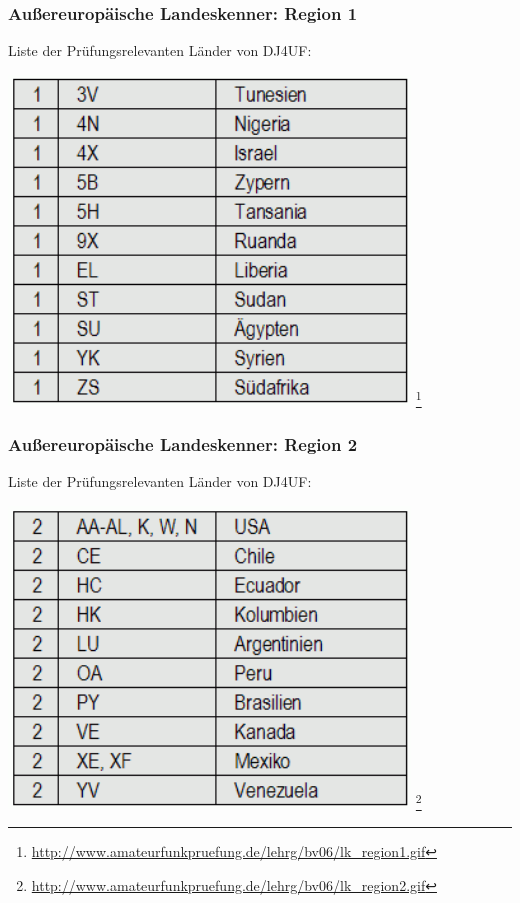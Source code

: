 \begin{frame}
    \frametitle{Außereuropäische Landeskenner: Region 1}

    Liste der Prüfungsrelevanten Länder von DJ4UF:

    \begin{center}
        \includegraphics[width=0.8\textwidth]{bv06/lk_region1.png}
        \footnote{\tiny \url{http://www.amateurfunkpruefung.de/lehrg/bv06/lk_region1.gif}}
    \end{center}

\end{frame}

\begin{frame}
    \frametitle{Außereuropäische Landeskenner: Region 2}

    Liste der Prüfungsrelevanten Länder von DJ4UF:

    \begin{center}
        \includegraphics[width=0.8\textwidth]{bv06/lk_region2.png}
        \footnote{\tiny \url{http://www.amateurfunkpruefung.de/lehrg/bv06/lk_region2.gif}}
    \end{center}

\end{frame}

